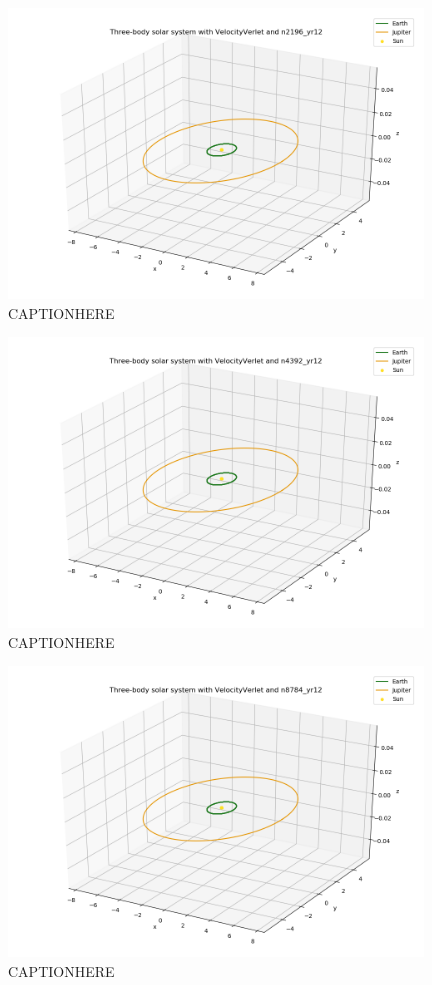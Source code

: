 \documentclass{article}
\begin{document}
    \begin{figure}[H]
        \centering
        \includegraphics[width = 11cm]{img/plot3D_S_E_J_V_n2196_yr12.png}
        \caption{CAPTIONHERE}
        \label{fig:plot3D_S_E_J_V_n2196_yr12}
    \end{figure}

    \begin{figure}[H]
        \centering
        \includegraphics[width = 11cm]{img/plot3D_S_E_J_V_n4392_yr12.png}
        \caption{CAPTIONHERE}
        \label{fig:plot3D_S_E_J_V_n4392_yr12}
    \end{figure}

    \begin{figure}[H]
        \centering
        \includegraphics[width = 11cm]{img/plot3D_S_E_J_V_n8784_yr12.png}
        \caption{CAPTIONHERE}
        \label{fig:plot3D_S_E_J_V_n8784_yr12}
    \end{figure}
\end{document}
